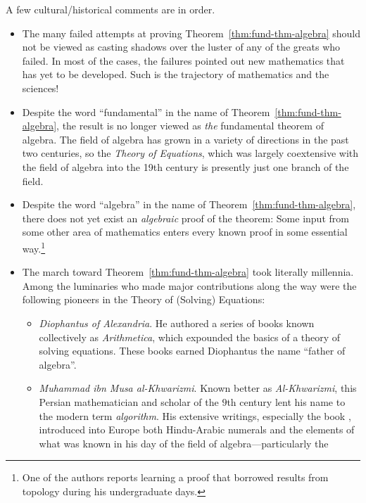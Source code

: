 A few cultural/historical comments are in order.
\begin{itemize}
\item
The many failed attempts at proving Theorem~\ref{thm:fund-thm-algebra}
should not be viewed as casting shadows over the luster of any of the
greats who failed.  In most of the cases, the failures pointed out new
mathematics that has yet to be developed.  Such is the trajectory of
mathematics and the sciences!
\item
Despite the word ``fundamental'' in the name of
Theorem~\ref{thm:fund-thm-algebra}, the result is no longer viewed as
{\em the} fundamental theorem of algebra.  The field of algebra has
grown in a variety of directions in the past two centuries, so the
{\em Theory of Equations}, which was largely coextensive with the
field of algebra into the 19th century is presently just one branch of
the field.
\item
Despite the word ``algebra'' in the name of
Theorem~\ref{thm:fund-thm-algebra}, there does not yet exist an {\em
  algebraic} proof of the theorem: Some input from some other area of
mathematics enters every known proof in some essential
way.\footnote{One of the authors reports learning a proof that
  borrowed results from topology during his undergraduate days.}
\item
The march toward Theorem~\ref{thm:fund-thm-algebra} took literally
millennia.  Among the luminaries who made major contributions along
the way were the following pioneers in the Theory of (Solving)
Equations:
  \begin{itemize}
  \item
{\it Diophantus of Alexandria}.  
He authored a series of books known collectively as {\it Arithmetica},
which expounded the basics of a theory of solving equations.  These
books earned Diophantus the name ``father of algebra''.
   \item
{\it Muhammad ibn Musa al-Khwarizmi}.
Known better as {\em Al-Khwarizmi}, this Persian mathematician and
scholar of the $9$th century lent his name to the modern term {\it
  algorithm}. His
extensive writings, especially the book \cite{Al-Khwarizmi},
introduced into Europe both Hindu-Arabic numerals
 and the elements of what
was known in his day of the field of algebra---particularly the

\end{itemize}
\end{itemize}
